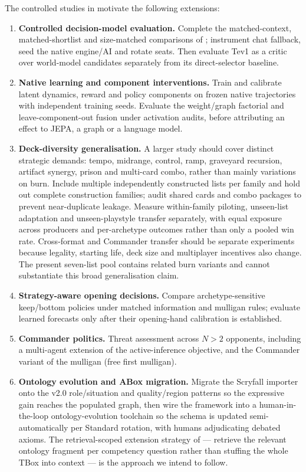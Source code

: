 \documentclass[11pt,a4paper]{article}
\theoremstyle{definition}
\theoremstyle{plain}
\begin{document}
The controlled studies in  motivate the following
extensions:
\begin{enumerate}[leftmargin=1.2em, itemsep=1pt]
  \item \textbf{Controlled decision-model evaluation.} Complete the matched-context, matched-shortlist and size-matched comparisons of ; instrument chat fallback, seed the native engine/AI and rotate seats. Then evaluate Tev1 as a critic over world-model candidates separately from its direct-selector baseline.
  \item \textbf{Native learning and component interventions.} Train and calibrate latent dynamics, reward and policy components on frozen native trajectories with independent training seeds. Evaluate the weight/graph factorial and leave-component-out fusion under activation audits, before attributing an effect to JEPA, a graph or a language model.
  \item \textbf{Deck-diversity generalisation.} A larger study should cover distinct strategic demands: tempo, midrange, control, ramp, graveyard recursion, artifact synergy, prison and multi-card combo, rather than mainly variations on burn. Include multiple independently constructed lists per family and hold out complete construction families; audit shared cards and combo packages to prevent near-duplicate leakage. Measure within-family piloting, unseen-list adaptation and unseen-playstyle transfer separately, with equal exposure across producers and per-archetype outcomes rather than only a pooled win rate. Cross-format and Commander transfer should be separate experiments because legality, starting life, deck size and multiplayer incentives also change. The present seven-list pool contains related burn variants and cannot substantiate this broad generalisation claim.
  \item \textbf{Strategy-aware opening decisions.} Compare archetype-sensitive keep/bottom policies under matched information and mulligan rules; evaluate learned forecasts only after their opening-hand calibration is established.
  \item \textbf{Commander politics.} Threat assessment across $N{>}2$ opponents, including a multi-agent extension of the active-inference objective, and the Commander variant of the mulligan (free first mulligan).
  \item \textbf{Ontology evolution and ABox migration.} Migrate the Scryfall importer onto the v2.0 role/situation and quality/region patterns so the expressive gain reaches the populated graph, then wire the framework into a human-in-the-loop ontology-evolution toolchain \citep{ontology_extender, garijo2026maseo} so the schema is updated semi-automatically per Standard rotation, with humans adjudicating debated axioms. The retrieval-scoped extension strategy of \citet{lippolis2026ontoextend} --- retrieve the relevant ontology fragment per competency question rather than stuffing the whole TBox into context --- is the approach we intend to follow.

\end{enumerate}
\end{document}
